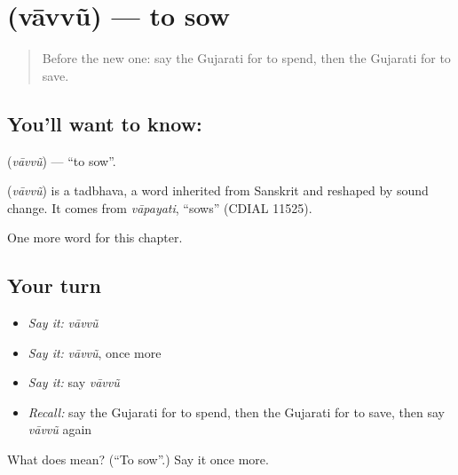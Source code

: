 \section[\texorpdfstring{\gu{વાવવું} (vāvvũ)}{વાવવું (vāvvũ)}]{ (vāvvũ) — to sow}

\label{lesson:GU-C142-vavvu}



\begin{quote}
Before the new one: say the Gujarati for to spend, then the Gujarati for to save.
\end{quote}

\subsection*{You'll want to know: }
\textbf{} (\emph{vāvvũ}) — \textquotedblleft{}to sow\textquotedblright{}.

\begin{cousinweb}
\textbf{} (\emph{vāvvũ}) is a tadbhava, a word inherited from Sanskrit and reshaped by sound change. It comes from \emph{vāpayati}, \textquotedblleft{}sows\textquotedblright{} (CDIAL 11525).
\end{cousinweb}

\begin{grammarlens}[title={What you've built}]
One more word for this chapter.
\end{grammarlens}

\subsection*{Your turn}
\begin{itemize}
\raggedright
  \item \emph{Say it:} \emph{vāvvũ}
  \item \emph{Say it:} \emph{vāvvũ}, once more
  \item \emph{Say it:} say \emph{vāvvũ}
  \item \emph{Recall:} say the Gujarati for to spend, then the Gujarati for to save, then say \emph{vāvvũ} again
\end{itemize}

\begin{tcolorbox}[breakable,colback=teal!4,colframe=teal!35!black,title={Before you move on}]
What does  mean? (\textquotedblleft{}To sow\textquotedblright{}.) Say it once more.
\end{tcolorbox}
